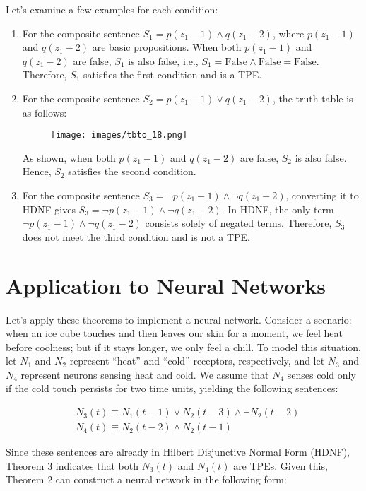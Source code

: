 \documentclass[11p,oneside]{book}
\begin{document}
Let’s examine a few examples for each condition:
\begin{enumerate}
    \item For the composite sentence $S_1 = p(z_1 - 1) \land q(z_1 - 2)$, where $p(z_1 - 1)$ and $q(z_1 - 2)$ are basic propositions. When both $p(z_1 - 1)$ and $q(z_1 - 2)$ are false, $S_1$ is also false, i.e., $S_1 = \text{False} \land \text{False} = \text{False}$. Therefore, $S_1$ satisfies the first condition and is a TPE.
    \item For the composite sentence $S_2 = p(z_1 - 1) \lor q(z_1 - 2)$, the truth table is as follows:
    
\begin{figure}[H]
        \centering
        \texttt{[image: images/tbto\_18.png]}
 \end{figure}
    
    As shown, when both $p(z_1 - 1)$ and $q(z_1 - 2)$ are false, $S_2$ is also false. Hence, $S_2$ satisfies the second condition.
    \item For the composite sentence $S_3 = \neg p(z_1 - 1) \land \neg q(z_1 - 2)$, converting it to HDNF gives $S_3 = \neg p(z_1 - 1) \land \neg q(z_1 - 2)$. In HDNF, the only term $\neg p(z_1 - 1) \land \neg q(z_1 - 2)$ consists solely of negated terms. Therefore, $S_3$ does not meet the third condition and is not a TPE.
\end{enumerate}

\section*{Application to Neural Networks}

Let’s apply these theorems to implement a neural network. Consider a scenario: when an ice cube touches and then leaves our skin for a moment, we feel heat before coolness; but if it stays longer, we only feel a chill. To model this situation, let $N_1$ and $N_2$ represent “heat” and “cold” receptors, respectively, and let $N_3$ and $N_4$ represent neurons sensing heat and cold. We assume that $N_4$ senses cold only if the cold touch persists for two time units, yielding the following sentences:

\begin{align*}
&N_3(t) \equiv N_1(t-1) \lor N_2(t-3) \land \lnot N_2(t-2) \\
&N_4(t) \equiv N_2(t-2) \land N_2(t-1)
\end{align*}

Since these sentences are already in Hilbert Disjunctive Normal Form (HDNF), Theorem 3 indicates that both $N_3(t)$ and $N_4(t)$ are TPEs. Given this, Theorem 2 can construct a neural network in the following form:
\end{document}
